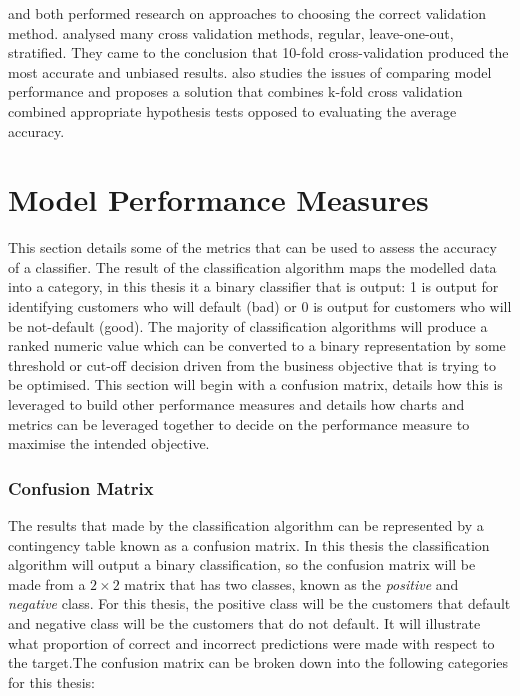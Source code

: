 \citep{kohavi_study_1995} and \citep{salzberg_comparing_1997} both performed research on approaches to choosing the correct validation method. \cite{kohavi_study_1995} analysed many cross validation methods, regular, leave-one-out, stratified. They came to the conclusion that 10-fold cross-validation produced the most accurate and unbiased results. \cite{salzberg_comparing_1997} also studies the issues of comparing model performance and proposes a solution that combines k-fold cross validation combined appropriate hypothesis tests opposed to evaluating the average accuracy.   



\section{Model Performance Measures}\label{modelPerformMeasure}

This section details some of the metrics that can be used to assess the accuracy of a classifier. The result of the classification algorithm maps the modelled data into a category, in this thesis it a binary classifier that is output: 1 is output for identifying customers who will default (bad) or 0 is output for customers who will be not-default (good). The majority of classification algorithms will produce a ranked numeric value which can be converted to a binary representation by some threshold or cut-off decision driven from  the business objective that is trying to be optimised. This section will begin with a confusion matrix, details how this is leveraged to build other performance measures and details how charts and metrics can be leveraged together to decide on the performance measure to maximise the intended objective.

\subsubsection{Confusion Matrix}

The results that made by the classification algorithm can be represented by a contingency table known as a confusion matrix. In this thesis the classification algorithm will output a binary classification, so the confusion matrix will be made from a $2 \times 2$ matrix that has two classes, known as the \textit{positive} and \textit{negative} class. For this thesis, the positive class will be the customers that default and negative class will be the customers that do not default. It will illustrate what proportion of correct and incorrect predictions were made with respect to the target.The confusion matrix can be broken down into the following categories for this thesis:

